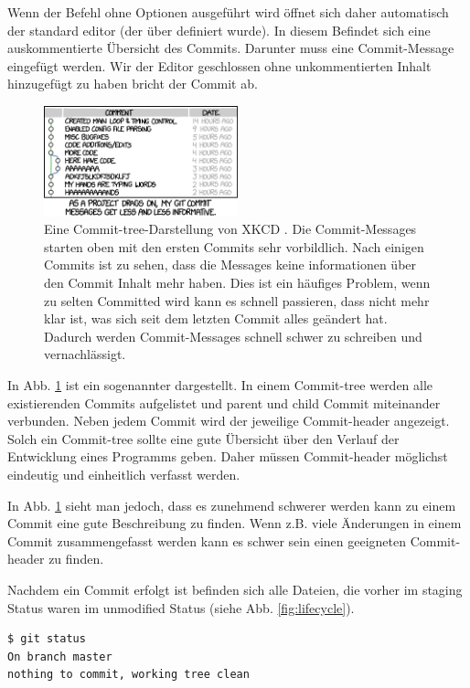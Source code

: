 Wenn der Befehl  ohne Optionen ausgeführt wird öffnet sich daher automatisch der standard editor (der über  definiert wurde). In diesem Befindet sich eine auskommentierte Übersicht des Commits. Darunter muss eine Commit-Message eingefügt werden. Wir der Editor geschlossen ohne unkommentierten Inhalt hinzugefügt zu haben bricht der Commit ab.
\begin{figure}[!h]
        \centering
        \includegraphics[width=0.5\textwidth]{Bilder/git_commit.png}
        \caption{Eine Commit-tree-Darstellung von XKCD \cite{Munroe}. Die Commit-Messages starten oben mit den ersten Commits sehr vorbildlich. Nach einigen Commits ist zu sehen, dass die Messages keine informationen über den Commit Inhalt mehr haben. Dies ist ein häufiges Problem, wenn zu selten Committed wird kann es schnell passieren, dass nicht mehr klar ist, was sich seit dem letzten Commit alles geändert hat. Dadurch werden Commit-Messages schnell schwer zu schreiben und vernachlässigt.}
        \label{fig:Commit-XKCD}
\end{figure}

In Abb. \ref{fig:Commit-XKCD} ist ein sogenannter  dargestellt. In einem Commit-tree werden alle existierenden Commits aufgelistet und parent und child Commit miteinander verbunden. Neben jedem Commit wird der jeweilige Commit-header angezeigt. Solch ein Commit-tree sollte eine gute Übersicht über den Verlauf der Entwicklung eines Programms geben. Daher müssen Commit-header möglichst eindeutig und einheitlich verfasst werden.

In Abb. \ref{fig:Commit-XKCD} sieht man jedoch, dass es zunehmend schwerer werden kann zu einem Commit eine gute Beschreibung zu finden. Wenn z.B. viele Änderungen in einem Commit zusammengefasst werden kann es schwer sein einen geeigneten Commit-header zu finden.

Nachdem ein Commit erfolgt ist befinden sich alle Dateien, die vorher im staging Status waren im unmodified Status (siehe Abb. \ref{fig:lifecycle}). 
\begin{lstlisting}
$ git status
On branch master
nothing to commit, working tree clean
\end{lstlisting}
